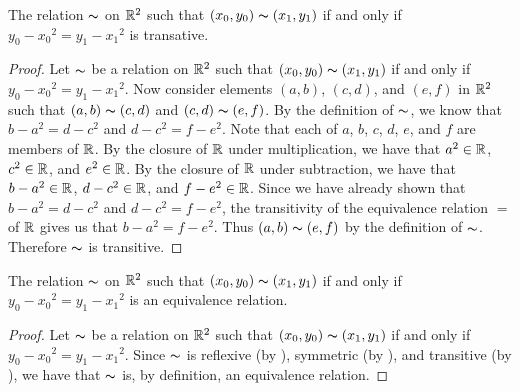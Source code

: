 \documentclass[../main.tex]{subfiles}
\begin{document}
\begin{thm}
	The relation \(\thicksim\) on \({\mathbb{R}}^2\) such that
	\(({x_0},{y_0})\thicksim({x_1},{y_1})\) if and only if
	\({y_0}-{{x_0}^2}={y_1}-{{x_1}^2}\) is transative.
\end{thm}
\begin{proof}
	Let \(\thicksim\) be a relation on \({\mathbb{R}}^2\) such that
	\(({x_0},{y_0}) \thicksim ({x_1},{y_1})\) if and only if
	\({y_0} - {{x_0}^2} = {y_1} - {{x_1}^2}\). Now consider elements
	\((a,b)\), \((c,d)\), and \((e,f)\) in \({\mathbb{R}}^2\) such that
	\((a,b) \thicksim (c,d)\) and \((c,d) \thicksim (e,f)\). By the
	definition of \(\thicksim\), we know that \(b - {{a}^2} = d - {{c}^2}\)
	and \(d - {{c}^2} = f - {{e}^2}\). Note that each of \(a\), \(b\),
	\(c\), \(d\), \(e\), and \(f\) are members of \(\mathbb{R}\). By the closure
	of \(\mathbb{R}\) under multiplication, we have that \({a}^2 \in \mathbb{R}\),
	\({c}^2 \in \mathbb{R}\), and \({e}^2 \in \mathbb{R}\). By the closure of
	\(\mathbb{R}\) under subtraction, we have that \(b - {{a}^2} \in \mathbb{R}\),
	\(d - {{c}^2} \in \mathbb{R}\), and \(f - {{e}^2} \in \mathbb{R}\). Since we
	have already shown that \(b - {{a}^2} = d - {{c}^2}\) and
	\(d - {{c}^2} = f - {{e}^2}\), the transitivity of the equivalence
	relation \(=\) of \(\mathbb{R}\) gives us that
	\(b - {{a}^2} = f - {{e}^2}\). Thus \((a,b)\thicksim(e,f)\) by the
	definition of \(\thicksim\). Therefore \(\thicksim\) is transitive.
\end{proof}

\begin{thm}
	The relation \(\thicksim\) on \({\mathbb{R}}^2\) such that
	\(({x_0},{y_0})\thicksim({x_1},{y_1})\) if and only if
	\({y_0}-{{x_0}^2}={y_1}-{{x_1}^2}\) is an equivalence relation.
\end{thm}
\begin{proof}
	Let \(\thicksim\) be a relation on \({\mathbb{R}}^2\) such that
	\(({x_0},{y_0}) \thicksim ({x_1},{y_1})\) if and only if
	\({y_0} - {{x_0}^2} = {y_1} - {{x_1}^2}\). Since \(\thicksim\) is
	reflexive (by ), symmetric (by ), and
	transitive (by ), we have that \(\thicksim\) is, by
	definition, an equivalence relation.
\end{proof}
\end{document}
